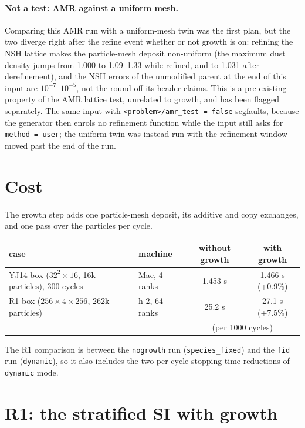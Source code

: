 \documentclass[11pt]{article}
\newcommand{\code}[1]{\texttt{#1}}
\begin{document}
\paragraph{Not a test: AMR against a uniform mesh.} Comparing this AMR run with a
uniform-mesh twin was the first plan, but the two diverge right after the refine event
whether or not growth is on: refining the NSH lattice makes the particle-mesh deposit
non-uniform (the maximum dust density jumps from 1.000 to 1.09--1.33 while refined, and
to 1.031 after derefinement), and the NSH errors of the unmodified parent at the end of
this input are $10^{-7}$--$10^{-5}$, not the round-off its header claims. This is a
pre-existing property of the AMR lattice test, unrelated to growth, and has been
flagged separately. The same input with \code{<problem>/amr\_test = false} segfaults,
because the generator then enrols no refinement function while the input still asks for
\code{method = user}; the uniform twin was instead run with the refinement window moved
past the end of the run.

\section{Cost}
The growth step adds one particle-mesh deposit, its additive and copy exchanges, and one
pass over the particles per cycle.
\begin{center}
\begin{tabular}{llcc}
\toprule
case & machine & without growth & with growth \\
\midrule
YJ14 box ($32^2\times16$, 16k particles), 300 cycles & Mac, 4 ranks & 1.453 s & 1.466 s
  (+0.9\%) \\
R1 box ($256\times4\times256$, 262k particles) & h-2, 64 ranks & 25.2 s & 27.1 s
  (+7.5\%) \\
 & & \multicolumn{2}{c}{(per 1000 cycles)} \\
\bottomrule
\end{tabular}
\end{center}
The R1 comparison is between the \code{nogrowth} run (\code{species\_fixed}) and the
\code{fid} run (\code{dynamic}), so it also includes the two per-cycle stopping-time
reductions of \code{dynamic} mode.

\section{R1: the stratified SI with growth}
\end{document}
